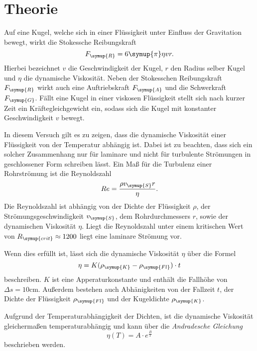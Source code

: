 \section{Theorie}
\label{sec:Theorie}
Auf eine Kugel, welche sich in einer Flüssigkeit unter Einfluss der Gravitation bewegt, wirkt die Stokessche Reibungskraft
\begin{equation}
    F_{\symup{R}}=6\symup{\pi}\eta v r.
\end{equation}
Hierbei bezeichnet $v$ die Geschwindigkeit der Kugel, $r$ den Radius selber Kugel und $\eta$ die dynamische Viskosität.
Neben der Stokesschen Reibungskraft $F_{\symup{R}}$ wirkt auch eine Auftriebskraft $F_{\symup{A}}$ und die Schwerkraft $F_{\symup{G}}$.
Fällt eine Kugel in einer viskosen Flüssigkeit stellt sich nach kurzer Zeit ein Kräftegleichgewicht ein, sodass sich die Kugel 
mit konstanter Geschwindigkeit $v$ bewegt.

In diesem Versuch gilt es zu zeigen, dass die dynamische Viskosität einer Flüssigkeit von der Temperatur abhängig ist. 
Dabei ist zu beachten, dass sich ein solcher Zusammenhang nur für laminare
und nicht für turbulente Strömungen in geschlossener Form schreiben lässt. Ein Maß für die Turbulenz einer Rohrströmung ist die Reynoldszahl
\begin{equation}
    Re=\frac{\rho v_{\symup{S}}r}{\eta}.
\end{equation}
Die Reynoldszahl ist abhängig von der Dichte der Flüssigkeit $\rho$, der Strömungsgeschwindigkeit $v_{\symup{S}}$, dem 
Rohrdurchmessers $r$, sowie der dynamischen Viskosität $\eta$. Liegt die Reynoldszahl unter einem kritischen Wert von
$R_{\symup{crit}}\approx 1200$ \cite[341/B102]{czichos} liegt eine laminare Strömung vor.

Wenn dies erfüllt ist, lässt sich die dynamische Viskosität $\eta$ über die Formel
\begin{equation}
    \eta = K(\rho_{\symup{K}}-\rho_{\symup{Fl}})\cdot t
\end{equation}
beschreiben. $K$ ist eine Apperaturkonstante und enthält die Fallhöhe von $\Delta s=10\unit{\centi\metre}$. Außerdem
bestehen auch Abhänigkeiten von der Fallzeit $t$, der Dichte der Flüssigkeit $\rho_{\symup{Fl}}$ und der Kugeldichte
$\rho_{\symup{K}}$.

Aufgrund der Temperaturabhängigkeit der Dichten, ist die dynamische Viskosität gleichermaßen temperaturabhängig und kann über 
die \textit{Andradesche Gleichung}
\begin{equation}
    \eta (T)=A\cdot e^{\frac{B}{T}}
    \label{eqn:Andradesche Gleichung}
\end{equation}
beschrieben werden.



